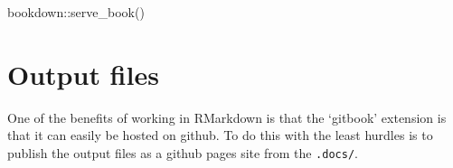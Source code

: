 \documentclass[
]{book}
\newenvironment{Shaded}{\begin{snugshade}}{\end{snugshade}}
\newcommand{\FunctionTok}[1]{\textcolor[rgb]{0.00,0.00,0.00}{#1}}
\newcommand{\NormalTok}[1]{#1}
\newcommand{\SpecialCharTok}[1]{\textcolor[rgb]{0.00,0.00,0.00}{#1}}
\begin{document}
\begin{Shaded}
\begin{Highlighting}[]
\NormalTok{bookdown}\SpecialCharTok{::}\FunctionTok{serve\_book}\NormalTok{()}
\end{Highlighting}
\end{Shaded}

\hypertarget{output-files}{%
\section{Output files}\label{output-files}}

One of the benefits of working in RMarkdown is that the `gitbook' extension is that it can easily be hosted on github. To do this with the least hurdles is to publish the output files as a github pages site from the \texttt{.docs/}.

  
\end{document}
